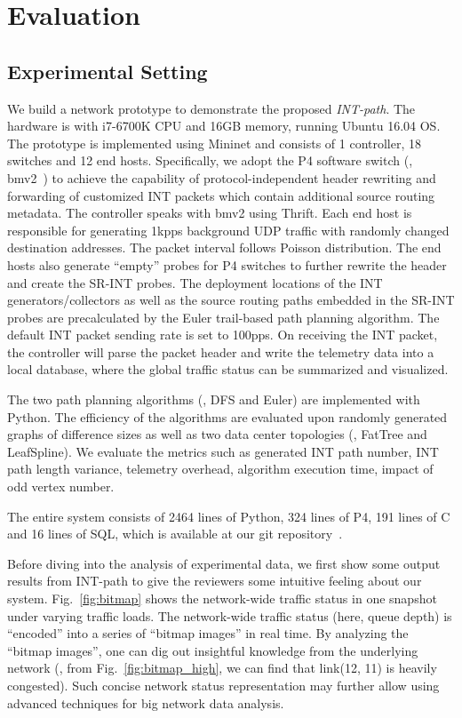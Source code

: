\section{Evaluation}
\label{sec:evaluation}

\subsection{Experimental Setting}

We build a network prototype to demonstrate the proposed \emph{INT-path}. The hardware is with i7-6700K CPU and 16GB memory, running Ubuntu 16.04 OS. The prototype is implemented using Mininet and consists of 1 controller, 18 switches and 12 end hosts. Specifically, we adopt the P4 software switch (\ie, bmv2~\cite{bmv2}) to achieve the capability of protocol-independent header rewriting and forwarding of customized INT packets which contain additional source routing metadata. The controller speaks with bmv2 using Thrift. Each end host is responsible for generating 1kpps background UDP traffic with randomly changed destination addresses. The packet interval follows Poisson distribution. The end hosts also generate ``empty'' probes for P4 switches to further rewrite the header and create the SR-INT probes. The deployment locations of the INT generators/collectors as well as the source routing paths embedded in the SR-INT probes are precalculated by the Euler trail-based path planning algorithm. The default INT packet sending rate is set to 100pps. On receiving the INT packet, the controller will parse the packet header and write the telemetry data into a local database, where the global traffic status can be summarized and visualized. 



The two path planning algorithms (\ie, DFS and Euler) are implemented with Python. The efficiency of the algorithms are evaluated upon randomly generated graphs of difference sizes as well as two data center topologies (\ie, FatTree and LeafSpline). We evaluate the metrics such as generated INT path number, INT path length variance, telemetry overhead, algorithm execution time, impact of odd vertex number.


The entire system consists of 2464 lines of Python, 324 lines of P4, 191 lines of C and 16 lines of SQL, which is available at our git repository~\cite{git}.

Before diving into the analysis of experimental data, we first show some output results from INT-path to give the reviewers some intuitive feeling about our system. Fig.~\ref{fig:bitmap} shows the network-wide traffic status in one snapshot under varying traffic loads. The network-wide traffic status (here, queue depth) is ``encoded'' into a series of ``bitmap images'' in real time. By analyzing the ``bitmap images'', one can dig out insightful knowledge from the underlying network (\eg, from Fig.~\ref{fig:bitmap_high}, we can find that link(12, 11) is heavily congested). Such concise network status representation may further allow using advanced techniques for big network data analysis.

